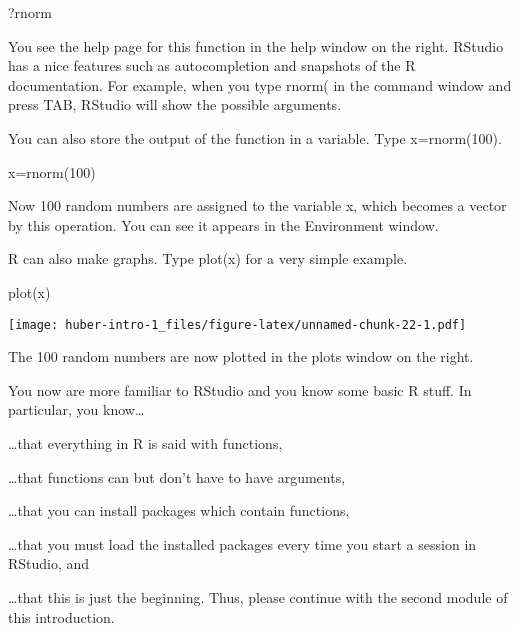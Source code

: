\documentclass[
]{article}
\newenvironment{Shaded}{\begin{snugshade}}{\end{snugshade}}
\newcommand{\DecValTok}[1]{\textcolor[rgb]{0.00,0.00,0.81}{#1}}
\newcommand{\FunctionTok}[1]{\textcolor[rgb]{0.00,0.00,0.00}{#1}}
\newcommand{\NormalTok}[1]{#1}
\newcommand{\OtherTok}[1]{\textcolor[rgb]{0.56,0.35,0.01}{#1}}
\begin{document}
\begin{Shaded}
\begin{Highlighting}[]
\NormalTok{?rnorm}
\end{Highlighting}
\end{Shaded}

You see the help page for this function in the help window on the right.
RStudio has a nice features such as autocompletion and snapshots of the
R documentation. For example, when you type rnorm( in the command window
and press TAB, RStudio will show the possible arguments.

You can also store the output of the function in a variable. Type
x=rnorm(100).

\begin{Shaded}
\begin{Highlighting}[]
\NormalTok{x}\OtherTok{=}\FunctionTok{rnorm}\NormalTok{(}\DecValTok{100}\NormalTok{)}
\end{Highlighting}
\end{Shaded}

Now 100 random numbers are assigned to the variable x, which becomes a
vector by this operation. You can see it appears in the Environment
window.

R can also make graphs. Type plot(x) for a very simple example.

\begin{Shaded}
\begin{Highlighting}[]
\FunctionTok{plot}\NormalTok{(x)}
\end{Highlighting}
\end{Shaded}

\texttt{[image: huber-intro-1\_files/figure-latex/unnamed-chunk-22-1.pdf]}

The 100 random numbers are now plotted in the plots window on the right.

You now are more familiar to RStudio and you know some basic R stuff. In
particular, you know\ldots{}

\ldots that everything in R is said with functions,

\ldots that functions can but don't have to have arguments,

\ldots that you can install packages which contain functions,

\ldots that you must load the installed packages every time you start a
session in RStudio, and

\ldots that this is just the beginning. Thus, please continue with the
second module of this introduction.
\end{document}
